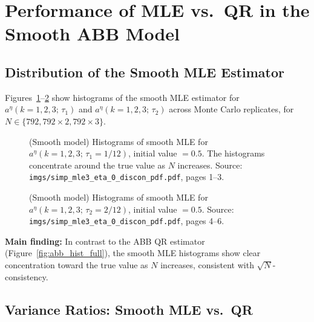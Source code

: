 \documentclass[12pt]{article}
\begin{document}
\section{Performance of MLE vs.\ QR in the Smooth ABB Model}
\label{sec:smooth_results}

\subsection{Distribution of the Smooth MLE Estimator}

Figures~\ref{fig:smooth_hist1}--\ref{fig:smooth_hist2} show histograms of
the smooth MLE estimator for $a^\eta(k=1,2,3;\,\tau_{1})$ and
$a^\eta(k=1,2,3;\,\tau_2)$ across Monte Carlo replicates, for
$N\in\{792,792\times2,792\times3\}$.

\begin{figure}[H]
\centering
\caption{(Smooth model) Histograms of smooth MLE for $a^\eta(k=1,2,3;\,\tau_1=1/12)$,
initial value $=0.5$.
The histograms concentrate around the true value as $N$ increases.
Source: \texttt{imgs/simp\_mle3\_eta\_0\_discon\_pdf.pdf}, pages 1--3.}
\label{fig:smooth_hist1}
\end{figure}

\begin{figure}[H]
\centering
\caption{(Smooth model) Histograms of smooth MLE for $a^\eta(k=1,2,3;\,\tau_2=2/12)$,
initial value $=0.5$.
Source: \texttt{imgs/simp\_mle3\_eta\_0\_discon\_pdf.pdf}, pages 4--6.}
\label{fig:smooth_hist2}
\end{figure}

\textbf{Main finding:} In contrast to the ABB QR estimator (Figure~\ref{fig:abb_hist_full}),
the smooth MLE histograms show clear concentration toward the true value as
$N$ increases, consistent with $\sqrt{N}$-consistency.

\subsection{Variance Ratios: Smooth MLE vs.\ QR}
\end{document}
